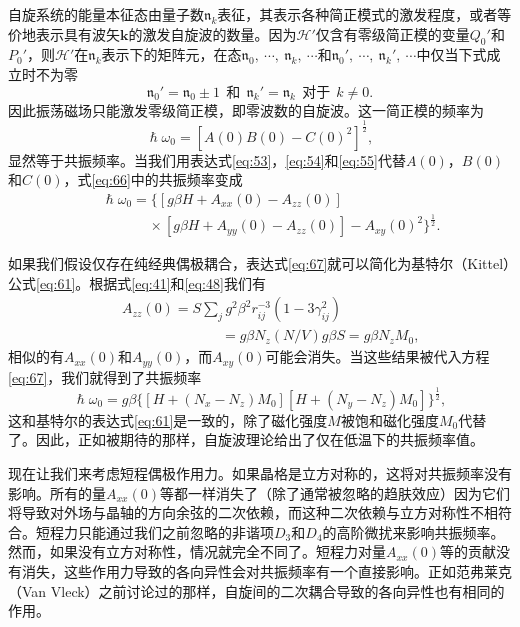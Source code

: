 \documentclass{article}
\begin{document}
自旋系统的能量本征态由量子数$\mathfrak{n}_k$表征，其表示各种简正模式的激发程度，或者等价地表示具有波矢$\mathbf{k}$的激发自旋波的数量。因为$\mathcal{H}'$仅含有零级简正模的变量$Q_0'$和$P_0'$，则$\mathcal{H}'$在$\mathfrak{n}_k$表示下的矩阵元，在态$\mathfrak{n}_0,~\cdots,~\mathfrak{n}_k,~\cdots$和$\mathfrak{n}_0',~\cdots,~\mathfrak{n}_k',~\cdots$中仅当下式成立时不为零
\begin{equation} \label{eq:65}
\mathfrak{n}_0'=\mathfrak{n}_0\pm 1~~\text{和}~~\mathfrak{n}_k'=\mathfrak{n}_k~~\text{对于}~~k\neq 0.
\end{equation}
因此振荡磁场只能激发零级简正模，即零波数的自旋波。这一简正模的频率为
\begin{equation} \label{eq:66}
\hslash\omega_0=[A(0)B(0)-C(0)^2]^{\frac{1}{2}},
\end{equation}
显然等于共振频率。当我们用表达式\eqref{eq:53}，\eqref{eq:54}和\eqref{eq:55}代替$A(0)$，$B(0)$和$C(0)$，式\eqref{eq:66}中的共振频率变成
\begin{eqnarray} \label{eq:67}
&&\hslash\omega_0=\{[g\beta H+A_{xx}(0)-A_{zz}(0)]\nonumber\\
&&\phantom{~~~~~~~~~~~~~~~}\times[g\beta H+A_{yy}(0)-A_{zz}(0)]-A_{xy}(0)^2\}^{\frac{1}{2}}.
\end{eqnarray}

如果我们假设仅存在纯经典偶极耦合，表达式\eqref{eq:67}就可以简化为基特尔（Kittel）公式\eqref{eq:61}。根据式\eqref{eq:41}和\eqref{eq:48}我们有
\begin{eqnarray} \label{eq:68}
&&A_{zz}(0)=S\sum\nolimits_jg^2\beta^2r_{ij}^{-3}(1-3\gamma_{ij}^2)\nonumber\\
&&\phantom{~~~~~~~~~~~~~~~~~~~~~~~~~~~~~~~~}=g\beta N_z(N/V)g\beta S=g\beta N_zM_0,
\end{eqnarray}
相似的有$A_{xx}(0)$和$A_{yy}(0)$，而$A_{xy}(0)$可能会消失。当这些结果被代入方程\eqref{eq:67}，我们就得到了共振频率
\begin{equation} \label{eq:69}
\hslash\omega_0=g\beta\{[H+(N_x-N_z)M_0][H+(N_y-N_z)M_0]\}^{\frac{1}{2}},
\end{equation}
这和基特尔的表达式\eqref{eq:61}是一致的，除了磁化强度$M$被饱和磁化强度$M_0$代替了。因此，正如被期待的那样，自旋波理论给出了仅在低温下的共振频率值。

现在让我们来考虑短程偶极作用力。如果晶格是立方对称的，这将对共振频率没有影响。所有的量$A_{xx}(0)$等都一样消失了（除了通常被忽略的趋肤效应）因为它们将导致对外场与晶轴的方向余弦的二次依赖，而这种二次依赖与立方对称性不相符合。短程力只能通过我们之前忽略的非谐项$D_3$和$D_4$的高阶微扰来影响共振频率。然而，如果没有立方对称性，情况就完全不同了。短程力对量$A_{xx}(0)$等的贡献没有消失，这些作用力导致的各向异性会对共振频率有一个直接影响。正如范弗莱克（Van Vleck）之前讨论过的那样，自旋间的二次耦合导致的各向异性也有相同的作用。
\end{document}
